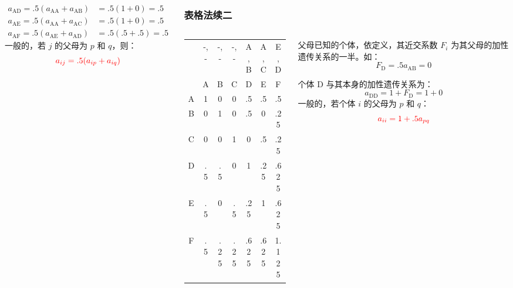 \documentclass[serif,aspectratio=169]{beamer}
\begin{document}
\begin{frame}
\begin{columns}
\begin{frame}
\begin{columns}
    \begin{column}{.5\textwidth}
      \begin{align*}
        a_{\mathrm{AD}} = .5(a_{\mathrm{AA}}+a_{\mathrm{AB}}) &= .5(1+0)=.5\\
        a_{\mathrm{AE}} = .5(a_{\mathrm{AA}}+a_{\mathrm{AC}}) &= .5(1+0)=.5\\
        a_{\mathrm{AF}} = .5(a_{\mathrm{AE}}+a_{\mathrm{AD}}) &= .5(.5+.5)=.5
      \end{align*}
      一般的，若 $j$ 的父母为 $p$ 和 $q$，则：
      $$\color{red}a_{ij} = .5(a_{ip} + a_{iq})$$
    \end{column}
  \end{columns}
\end{frame}


\begin{frame}
  \frametitle{表格法\tiny{续二}}
  \begin{columns}
    \begin{column}{.5\textwidth}
      \centering
      \begin{tabular}{c|ccc|ccc}
        & -,- & -,- & -,- & A,B & A,C & E,D\\
        & A & B & C & D & E & F\\\hline
        A & 1 & 0 & 0 & .5 & .5 & .5\\
        B & 0 & 1 & 0 & .5 & 0 & .25\\
        C & 0 & 0 & 1 & 0 & .5 & .25\\\hline
        D & .5 & .5 & 0 & 1 & .25 & .625\\
        E & .5 & 0 & .5 & .25 & 1 & .625\\
        F & .5 & .25 & .25 & .625 & .625 & 1.125
      \end{tabular}
    \end{column}

    \begin{column}{.5\textwidth}
      父母已知的个体，依定义，其近交系数 $F_i$ 为其父母的加性遗传关系的一半。如：
      $$F_{\mathrm{D}} = .5a_{\mathrm{AB}} = 0$$

      个体 D 与其本身的加性遗传关系为：
      $$a_{\mathrm{DD}} = 1+F_{\mathrm{D}} = 1+0$$
      一般的，若个体 $i$ 的父母为 $p$ 和 $q$：
      $$\color{red}a_{ii} = 1+.5a_{pq}$$
    \end{column}
  \end{columns}
\end{frame}



\end{columns}
\end{frame}
\end{document}
